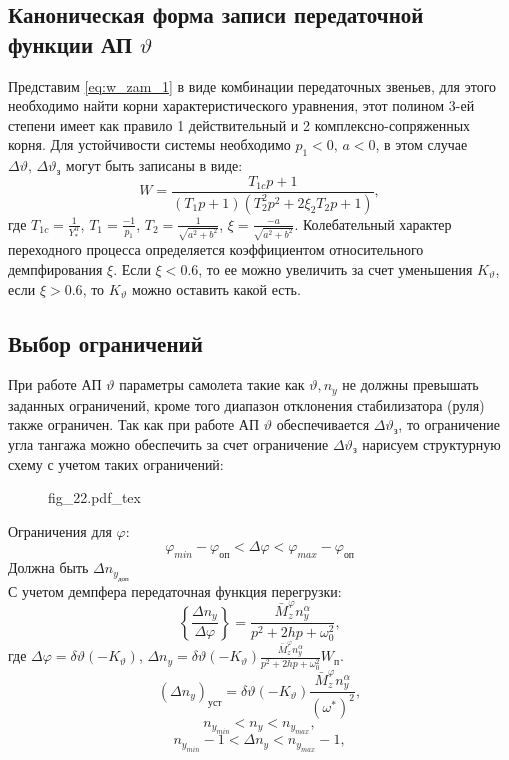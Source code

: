 \documentclass{article}
\begin{document}
\subsection{Каноническая форма записи передаточной функции АП
	\texorpdfstring{$\vartheta$}{Lg}}
Представим \ref{eq:w_zam_1} в виде комбинации передаточных звеньев, для этого
необходимо найти корни характеристического уравнения, этот полином 3-ей степени
имеет как правило 1 действительный и 2 комплексно-сопряженных корня. Для
устойчивости системы необходимо $p_1 < 0, \, a<0$, в этом случае $\Delta
	\vartheta, \, \Delta \vartheta_\text{з}$ могут быть записаны в виде:
\[
	W = \frac{T_{1c} p + 1}{(T_{1}p + 1)(T_2^2 p^2 + 2 \xi_2 T_2 p + 1)},
\]
где $T_{1c} = \frac{1}{Y_*^\alpha}$, $T_1 = \frac{-1}{p_1}$, $T_2 =
	\frac{1}{\sqrt{a^2 + b^2}}$, $\xi = \frac{-a}{\sqrt{a^2 + b^2}}$.
Колебательный характер переходного процесса определяется коэффициентом
относительного демпфирования $\xi$. Если $\xi < 0.6$, то ее можно увеличить за
счет уменьшения $K_\vartheta$, если $\xi > 0.6$, то $K_\vartheta$ можно
оставить какой есть.
\subsection{Выбор ограничений}
При работе АП $\vartheta$ параметры самолета такие как $\vartheta, n_y$ не
должны превышать заданных ограничений, кроме того диапазон отклонения
стабилизатора (руля) также ограничен. Так как при работе АП $\vartheta$
обеспечивается $\Delta \vartheta_\text{з}$, то ограничение угла тангажа можно
обеспечить за счет ограничение $\Delta \vartheta_\text{з}$ нарисуем структурную
схему с учетом таких ограничений:

\begin{figure}[H]
	\centering
	{fig_22.pdf_tex}
\end{figure}

Ограничения для $\varphi$:
\[ \varphi_{min} - \varphi_\text{оп} < \Delta \varphi < \varphi_{max} -
	\varphi_\text{оп}\]
Должна быть $\Delta n_{y_\text{доп}}$\\
С учетом демпфера передаточная функция перегрузки:
\[
	\left\{\frac{\Delta n_y}{\Delta \varphi}\right\} = \frac{\bar{M}_z^\varphi
		n_y^\alpha}{p^2 + 2hp + \omega_0^2},
\]
где $\Delta \varphi = \delta \vartheta (-K_\vartheta)$, $\Delta n_y = \delta
	\vartheta (-K_\vartheta ) \frac{\bar{M}_z^\varphi n_y^\alpha}{p^2 + 2hp +
		\omega_0^2}W_\text{п}$.
\[
	(\Delta n_y)_\text{уст} = \delta \vartheta (-
	K_\vartheta)\frac{\bar{M}_z^\varphi n_y^\alpha}{(\omega^*)^2},
\]
\[
	n_{{y}_{min}} < n_y < n_{{y}_{max}},
\]
\[
	n_{{y}_{min}} - 1< \Delta n_y < n_{{y}_{max}} - 1,
\]
\end{document}
